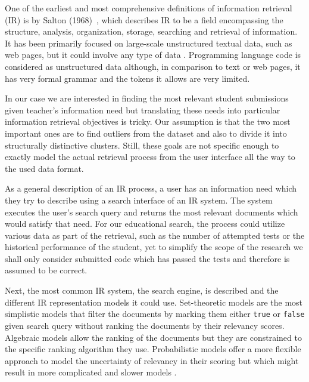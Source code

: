 One of the earliest and most comprehensive definitions of information retrieval (IR) is by Salton (1968)~\cite{salton-1968}, which describes IR to be a field encompassing the structure, analysis, organization, storage, searching and retrieval of information. It has been primarily focused on large-scale unstructured textual data, such as web pages, but it could involve any type of data \cite{ir-in-practise}. Programming language code is considered as unstructured data although, in comparison to text or web pages, it has very formal grammar and the tokens it allows are very limited.

In our case we are interested in finding the most relevant student submissions given teacher's information need but translating these needs into particular information retrieval objectives is tricky. Our assumption is that the two most important ones are to find outliers from the dataset and also to divide it into structurally distinctive clusters. Still, these goals are not specific enough to exactly model the actual retrieval process from the user interface all the way to the used data format.

As a general description of an IR process, a user has an information need which they try to describe using a search interface of an IR system. The system executes the user's search query and returns the most relevant documents which would satisfy that need. For our educational search, the process could utilize various data as part of the retrieval, such as the number of attempted tests or the historical performance of the student, yet to simplify the scope of the research we shall only consider submitted code which has passed the tests and therefore is assumed to be correct.

Next, the most common IR system, the search engine, is described and the different IR representation models it could use. Set-theoretic models are the most simplistic models that filter the documents by marking them either \texttt{true} or \texttt{false} given search query without ranking the documents by their relevancy scores. Algebraic models allow the ranking of the documents but they are constrained to the specific ranking algorithm they use. Probabilistic models offer a more flexible approach to model the uncertainty of relevancy in their scoring but which might result in more complicated and slower models \cite{intro-to-ir, ir-in-practise}.

